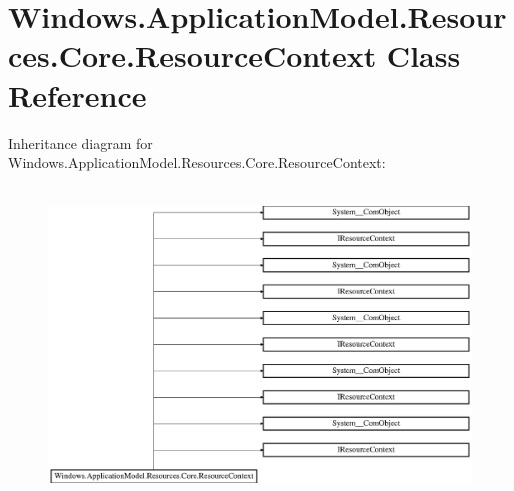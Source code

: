 \hypertarget{class_windows_1_1_application_model_1_1_resources_1_1_core_1_1_resource_context}{}\section{Windows.\+Application\+Model.\+Resources.\+Core.\+Resource\+Context Class Reference}
\label{class_windows_1_1_application_model_1_1_resources_1_1_core_1_1_resource_context}
Inheritance diagram for Windows.\+Application\+Model.\+Resources.\+Core.\+Resource\+Context\+:\begin{figure}[H]
\begin{center}
\leavevmode
\includegraphics[height=8.369565cm]{class_windows_1_1_application_model_1_1_resources_1_1_core_1_1_resource_context}
\end{center}
\end{figure}
